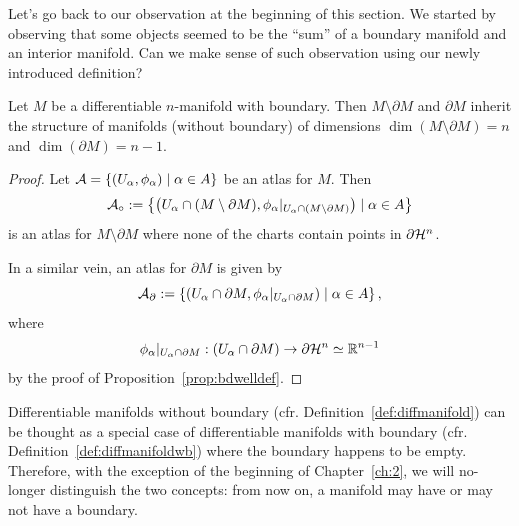 Let's go back to our observation at the beginning of this section.
We started by observing that some objects seemed to be the ``sum'' of a boundary manifold and an interior manifold.
Can we make sense of such observation using our newly introduced definition?

\begin{prop}
  Let $M$ be a differentiable $n$-manifold with boundary.
  Then $M\setminus\partial M$ and $\partial M$ inherit the structure of manifolds (without boundary) of dimensions $\dim(M\setminus\partial M)=n$ and $\dim(\partial M) = n-1$.
\end{prop}
\begin{proof}
  Let $\mathcal{A} = \{(U_\alpha,\phi_\alpha) \mid \alpha\in A\}$ be an atlas for $M$. 
  Then
  \begin{equation}
    \mathcal{A}_\circ := \left\{
      \left(
        U_\alpha \cap (M\setminus\partial M),
        \phi_\alpha|_{U_\alpha \cap (M\setminus\partial M)}
        \right) \mid \alpha\in A
      \right\}
  \end{equation}
  is an atlas for $M\setminus\partial M$ where none of the charts contain points in $\partial\mathcal{H}^n$.

  In a similar vein, an atlas for $\partial M$ is given by
  \begin{equation}
    \mathcal{A}_\partial := \left\{
      \left(
        U_\alpha \cap \partial M,
        \phi_\alpha|_{U_\alpha \cap \partial M}
        \right) \mid \alpha\in A
      \right\},
  \end{equation}
  where
  \begin{equation}
    \phi_\alpha|_{U_\alpha \cap \partial M} : (U_\alpha \cap \partial M) \to \partial\mathcal{H}^n\simeq\mathbb{R}^{n-1}
  \end{equation}
  by the proof of Proposition~\ref{prop:bdwelldef}.
\end{proof}

\begin{tcolorbox}
  Differentiable manifolds without boundary (cfr. Definition~\ref{def:diffmanifold}) can be thought as a special case of differentiable manifolds with boundary (cfr. Definition~\ref{def:diffmanifoldwb}) where the boundary happens to be empty.
  Therefore, with the exception of the beginning of Chapter~\ref{ch:2}, we will no-longer distinguish the two concepts: from now on, a manifold may have or may not have a boundary.
\end{tcolorbox}